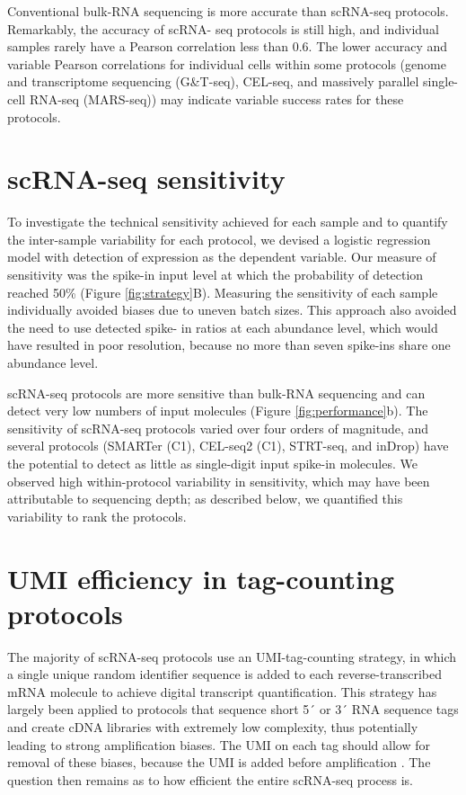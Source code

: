 Conventional bulk-RNA sequencing is more accurate than scRNA-seq protocols. Remarkably, the accuracy of scRNA- seq protocols is still high, and individual samples rarely have a Pearson correlation less than 0.6. The lower accuracy and variable Pearson correlations for individual cells within some protocols (genome and transcriptome sequencing (G\&T-seq), CEL-seq, and massively parallel single-cell RNA-seq (MARS-seq)) may indicate variable success rates for these protocols.

\section{scRNA-seq sensitivity}

To investigate the technical sensitivity achieved for each sample and to quantify the inter-sample variability for each protocol, we devised a logistic regression model with detection of expression as the dependent variable. Our measure of sensitivity was the spike-in input level at which the probability of detection reached 50\% (Figure \ref{fig:strategy}B). Measuring the sensitivity of each sample individually avoided biases due to uneven batch sizes. This approach also avoided the need to use detected spike- in ratios at each abundance level, which would have resulted in poor resolution, because no more than seven spike-ins share one abundance level.

scRNA-seq protocols are more sensitive than bulk-RNA sequencing and can detect very low numbers of input molecules (Figure \ref{fig:performance}b). The sensitivity of scRNA-seq protocols varied over four orders of magnitude, and several protocols (SMARTer (C1), CEL-seq2 (C1), STRT-seq, and inDrop) have the potential to detect as little as single-digit input spike-in molecules. We observed high within-protocol variability in sensitivity, which may have been attributable to sequencing depth; as described below, we quantified this variability to rank the protocols.

\section{UMI efficiency in tag-counting protocols}

The majority of scRNA-seq protocols use an UMI-tag-counting strategy, in which a single unique random identifier sequence is added to each reverse-transcribed mRNA molecule to achieve digital transcript quantification. This strategy has largely been applied to protocols that sequence short 5´ or 3´ RNA sequence tags and create cDNA libraries with extremely low complexity, thus potentially leading to strong amplification biases. The UMI on each tag should allow for removal of these biases, because the UMI is added before amplification  \cite{Islam2014-dx}. The question then remains as to how efficient the entire scRNA-seq process is.

